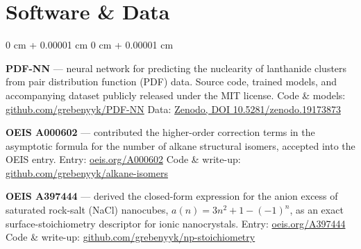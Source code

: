 \documentclass[10pt, letterpaper]{article}
\newenvironment{onecolentry}{
    \begin{adjustwidth}{
        0 cm + 0.00001 cm
    }{
        0 cm + 0.00001 cm
    }
}{
    \end{adjustwidth}
} %
\begin{document}
    \section{Software \& Data}
    \vspace{0.04 cm}
    \begin{onecolentry}
        \textbf{PDF-NN} — neural network for predicting the nuclearity of lanthanide clusters from pair distribution function (PDF) data. Source code, trained models, and accompanying dataset publicly released under the MIT license.\newline
        Code \& models: \href{https://github.com/grebenyyk/PDF-NN}{github.com/grebenyyk/PDF-NN} \quad Data: \href{https://doi.org/10.5281/zenodo.19173873}{Zenodo, DOI 10.5281/zenodo.19173873}

        \vspace{0.06cm}
        \textbf{OEIS A000602} — contributed the higher-order correction terms in the asymptotic formula for the number of alkane structural isomers, accepted into the OEIS entry.\newline
        Entry: \href{https://oeis.org/A000602}{oeis.org/A000602} \quad Code \& write-up: \href{https://github.com/grebenyyk/alkane-isomers}{github.com/grebenyyk/alkane-isomers}

        \vspace{0.06cm}
        \textbf{OEIS A397444} — derived the closed-form expression for the anion excess of saturated rock-salt (NaCl) nanocubes, $a(n) = 3n^2 + 1 - (-1)^n$, as an exact surface-stoichiometry descriptor for ionic nanocrystals.\newline
        Entry: \href{https://oeis.org/A397444}{oeis.org/A397444} \quad Code \& write-up: \href{https://github.com/grebenyyk/np-stoichiometry}{github.com/grebenyyk/np-stoichiometry}
    \end{onecolentry}

\end{document}
